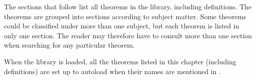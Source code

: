 \label{theorems}

The sections that follow list all theorems in the  library,
including definitions. The theorems are grouped into sections according to
subject matter. Some theorems could be classified under more than one subject,
but each theorem is listed in only one section. The reader may therefore have
to consult more than one section when searching for any particular theorem.

When the  library is loaded, all the theorems listed in this
chapter (including definitions) are set up to autoload when their names are
mentioned in \ML.

